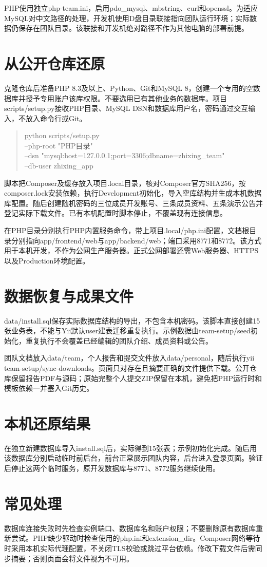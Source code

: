 \documentclass[UTF8,a4paper,11pt,fontset=windows]{ctexart}
\begin{document}
PHP使用独立php-team.ini，启用pdo\_mysql、mbstring、curl和openssl。为适应MySQL对中文路径的处理，开发机使用D盘目录联接指向团队运行环境；实际数据仍保存在团队目录。该联接和开发机绝对路径不作为其他电脑的部署前提。

\section{从公开仓库还原}
克隆仓库后准备PHP 8.3及以上、Python、Git和MySQL 8，创建一个专用的空数据库并授予专用账户该库权限。不要选用已有其他业务的数据库。项目scripts/setup.py接收PHP目录、MySQL DSN和数据库用户名，密码通过交互输入，不放入命令行或Git。

\begin{quote}\ttfamily\small
python scripts/setup.py\\
--php-root "PHP目录"\\
--dsn "mysql:host=127.0.0.1;port=3306;dbname=zhixing\_team"\\
--db-user zhixing\_app
\end{quote}

脚本把Composer及缓存放入项目.local目录，核对Composer官方SHA256，按composer.lock安装依赖，执行Development初始化，导入空库结构并生成本机数据库配置。随后创建随机密码的三位成员开发账号、三条成员资料、五条演示公告并登记实际下载文件。已有本机配置时脚本停止，不覆盖现有连接信息。

在PHP目录分别执行PHP内置服务命令，带上项目.local/php.ini配置，文档根目录分别指向app/frontend/web与app/backend/web；端口采用8771和8772。该方式用于本机开发，不作为公网生产服务器。正式公网部署还需Web服务器、HTTPS以及Production环境配置。

\section{数据恢复与成果文件}
data/install.sql保存实际数据库结构的导出，不包含本机密码。该脚本直接创建15张业务表，不能与Yii默认user建表迁移重复执行。示例数据由team-setup/seed初始化，重复执行不会覆盖已经编辑的团队介绍、成员资料或公告。

团队文档放入data/team，个人报告和提交文件放入data/personal，随后执行yii team-setup/sync-downloads。页面只对存在且摘要正确的文件提供下载。公开仓库保留报告PDF与源码；原始完整个人提交ZIP保留在本机，避免把PHP运行时和模板依赖一并塞入Git历史。

\section{本机还原结果}
在独立新建数据库导入install.sql后，实际得到15张表；示例初始化完成。随后用该数据库分别启动临时前后台，前台正常展示团队内容，后台进入登录页面。验证后停止这两个临时服务，原开发数据库与8771、8772服务继续使用。

\section{常见处理}
数据库连接失败时先检查实例端口、数据库名和账户权限；不要删除原有数据库重新尝试。PHP缺少驱动时检查使用的php.ini和extension\_dir。Composer网络等待时采用本机实际代理配置，不关闭TLS校验或跳过平台依赖。修改下载文件后需同步摘要；否则页面会将文件视为不可用。
\end{document}
